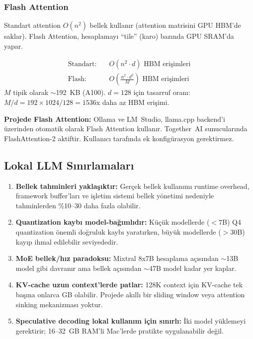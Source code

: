 \subsubsection{Flash Attention}

Standart attention $O(n^2)$ bellek kullan{\i}r (attention matrisini GPU HBM'de saklar). Flash Attention, hesaplamay{\i} ``tile'' (karo) baz{\i}nda GPU SRAM'da yapar.

\begin{formulbox}
\begin{align}
\text{Standart:} \quad &O(n^2 \cdot d) \text{ HBM eri\c{s}imleri} \label{eq:standard-io} \\
\text{Flash:} \quad &O\!\left(\frac{n^2 \cdot d^2}{M}\right) \text{ HBM eri\c{s}imleri} \label{eq:flash-io}
\end{align}
$M$ tipik olarak $\sim$192~KB (A100). $d = 128$ i\c{c}in tasarruf oran{\i}: $M / d = 192 \times 1024 / 128 = 1536$x daha az HBM eri\c{s}imi.
\end{formulbox}

\textbf{Projede Flash Attention:} Ollama ve LM~Studio, llama.cpp backend'i \"{u}zerinden otomatik olarak Flash Attention kullan{\i}r. Together~AI sunucular{\i}nda FlashAttention-2 aktiftir. Kullan{\i}c{\i} taraf{\i}nda ek konfig\"{u}rasyon gerektirmez.


\subsection{Lokal LLM S{\i}n{\i}rlamalar{\i}}
\label{sec:local-limitations}

\begin{enumerate}
  \item \textbf{Bellek tahminleri yakla\c{s}{\i}kt{\i}r:} Ger\c{c}ek bellek kullan{\i}m{\i} runtime overhead, framework buffer'lar{\i} ve i\c{s}letim sistemi bellek y\"{o}netimi nedeniyle tahminlerden \%10--30 daha fazla olabilir.

  \item \textbf{Quantization kayb{\i} model-ba\u{g}{\i}ml{\i}d{\i}r:} K\"{u}\c{c}\"{u}k modellerde ($< 7$B) Q4 quantization \"{o}nemli do\u{g}ruluk kayb{\i} yarat{\i}rken, b\"{u}y\"{u}k modellerde ($> 30$B) kay{\i}p ihmal edilebilir seviyededir.

  \item \textbf{MoE bellek/h{\i}z paradoksu:} Mixtral 8x7B hesaplama a\c{c}{\i}s{\i}ndan $\sim$13B model gibi davran{\i}r ama bellek a\c{c}{\i}s{\i}ndan $\sim$47B model kadar yer kaplar.

  \item \textbf{KV-cache uzun context'lerde patlar:} 128K context i\c{c}in KV-cache tek ba\c{s}{\i}na onlarca GB olabilir. Projede ak{\i}ll{\i} bir sliding window veya attention sinking mekanizmas{\i} yoktur.

  \item \textbf{Speculative decoding lokal kullan{\i}m i\c{c}in s{\i}n{\i}rl{\i}:} \.{I}ki model y\"{u}klemeyi gerektirir; 16--32~GB RAM'li Mac'lerde pratikte uygulanabilir de\u{g}il.
\end{enumerate}


